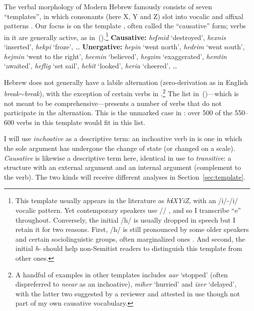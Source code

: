 The verbal morphology of Modern Hebrew famously consists of seven ``templates'', in which consonants (here X, Y and Z) slot into vocalic and affixal patterns \citep{doron03,arad05,borer13oup,kastner16phd}. Our focus is on the template {\thif}, often called the ``causative'' form; verbs in it are generally active, as in~(\nextx).\footnote{This template usually appears in the literature as \emph{h\textbf{i}XYiZ}, with an /i/-/i/ vocalic pattern. Yet contemporary speakers use // \citep{trachtman16}, and so I transcribe ``e'' throughout. Conversely, the initial /h/ is usually dropped in speech but I retain it for two reasons. First, /h/ is still pronounced by some older speakers and certain sociolinguistic groups, often marginalized ones \citep[cf.~][]{schwarzwald81biu,gafter14phd}. And second, the initial \emph{h}- should help non-Semitist readers to distinguish this template from other ones.}
\pex\label{ex:thif-active}
	\a \textbf{Causative:} \emph{heʃmid} `destroyed', \emph{hexnis} `inserted', \emph{hekpi} `froze', \dots
	\a \textbf{Unergative:} \emph{he{\texttslig}pin} `went north', \emph{hedrim} `went south', \emph{hejmin} `went to the right', \emph{heemin} `believed', \emph{hegzim} `exaggerated', \emph{hemtin} `awaited', \emph{heflig} `set sail', \emph{hebit} `looked', \emph{heria} `cheered', \dots
\xe

Hebrew does not generally have a labile alternation (zero-derivation as in English \emph{break}$\sim$\emph{break}), with the exception of certain verbs in {\thif}.\footnote{A handful of examples in other templates includes \emph{a{\texttslig}ar} `stopped' (often dispreferred to \emph{nee{\texttslig}ar} as an inchoative), \emph{miher} `hurried' and \emph{ixer} `delayed', with the latter two suggested by a reviewer and attested in use though not part of my own causative vocabulary.} The list in~(\lastx)---which is not meant to be comprehensive---presents a number of verbs that do not participate in the alternation. This is the unmarked case in \thif: over 500 of the 550--600 verbs in this template would fit in this list.

I will use \emph{inchoative} as a descriptive term: an inchoative verb in {\thif} is one in which the sole argument has undergone the change of state (or changed on a scale). \emph{Causative} is likewise a descriptive term here, identical in use to \emph{transitive}: a structure with an external argument and an internal argument (complement to the verb). The two kinds will receive different analyses in Section~\ref{sec:template}.

